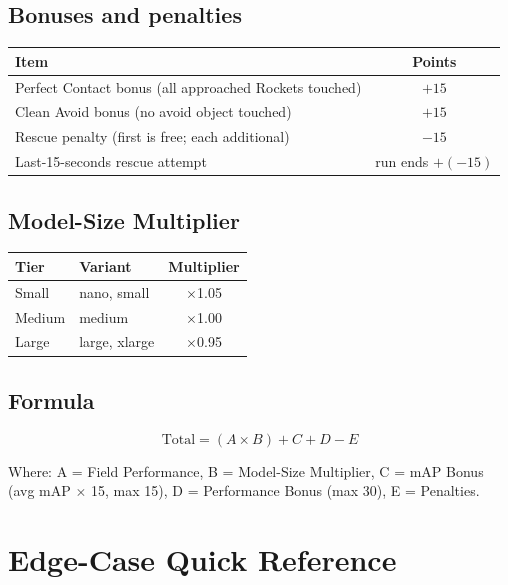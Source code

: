 \documentclass[a4]{article}
\begin{document}
\subsection*{Bonuses and penalties}

\begin{table}[H]
\centering
\begin{tabular}{lc}
\toprule
\textbf{Item} & \textbf{Points} \\
\midrule
Perfect Contact bonus (all approached Rockets touched) & $+15$ \\
Clean Avoid bonus (no avoid object touched) & $+15$ \\
Rescue penalty (first is free; each additional) & $-15$ \\
Last-15-seconds rescue attempt & run ends $+ (-15)$ \\
\bottomrule
\end{tabular}
\end{table}

\subsection*{Model-Size Multiplier}

\begin{table}[H]
\centering
\begin{tabular}{llc}
\toprule
\textbf{Tier} & \textbf{Variant} & \textbf{Multiplier} \\
\midrule
Small & nano, small & $\times$1.05 \\
Medium & medium & $\times$1.00 \\
Large & large, xlarge & $\times$0.95 \\
\bottomrule
\end{tabular}
\end{table}

\subsection*{Formula}

\begin{equation*}
\boxed{\text{Total} = (A \times B) + C + D - E}
\end{equation*}

Where: A = Field Performance, B = Model-Size Multiplier, C = mAP Bonus (avg mAP $\times$ 15, max 15), D = Performance Bonus (max 30), E = Penalties.

\pagebreak
\section*{Edge-Case Quick Reference}
\end{document}
